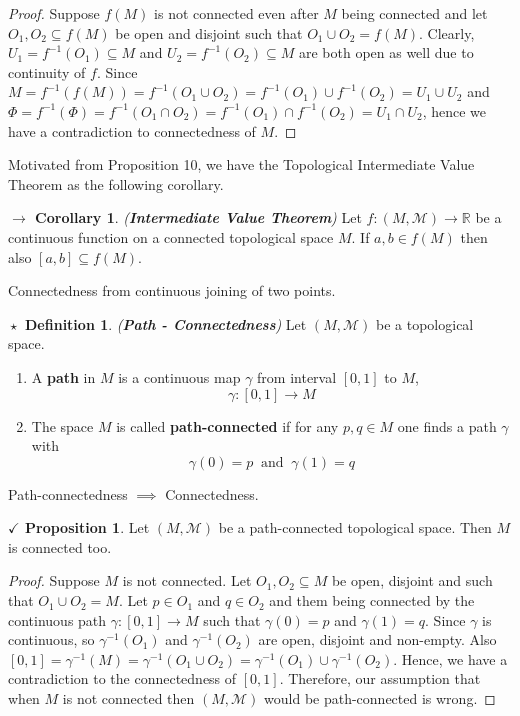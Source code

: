 \documentclass{article}
\theoremstyle{definition}
\newtheorem{definition}{$\boxed{\star}$ Definition}
\newcommand{\tit}[1]{\textit{#1}}
\theoremstyle{remark}
\theoremstyle{definition}
\newtheorem{corollary}{$ \to $ Corollary}
\theoremstyle{definition}
\newtheorem{proposition}{$\checkmark$ Proposition}
\newcommand{\topo}[1]{\mathcal{#1}}
\newcommand{\path}[0]{\gamma}
\begin{document}
\begin{proof}
	Suppose $ f(M) $ is not connected even after $ M $ being connected and let $ O_1 ,O_2 \subseteq f(M) $ be open and disjoint such that $ O_1 \cup O_2 = f(M) $. Clearly, $ U_1 = f^{-1}(O_1) \subseteq M $ and $ U_2 = f^{-1}(O_2) \subseteq M $ are both open as well due to continuity of $ f $. Since $ M = f^{-1}(f(M)) =  f^{-1} \left ( O_1 \cup O_2 \right ) = f^{-1}(O_1) \cup f^{-1}(O_2) = U_1 \cup U_2$ and $\Phi = f^{-1} (\Phi) = f^{-1} (O_1 \cap O_2) = f^{-1} (O_1) \cap f^{-1}(O_2) = U_1 \cap U_2$, hence we have a contradiction to connectedness of $ M $.
\end{proof}
\hrulefill
Motivated from Proposition 10, we have the Topological Intermediate Value Theorem as the following corollary.
\hrulefill
\begin{corollary}
	\tit{(\textbf{Intermediate Value Theorem})} Let $ f : (M,\topo{M}) \longrightarrow \mathbb{R} $ be a continuous function on a connected topological space $ M $. If $ a,b \in f(M) $ then also $ [a,b]  \subseteq f(M)$.
\end{corollary}
\hrulefill
Connectedness from continuous joining of two points.
\hrulefill
\begin{definition}
	\tit{(\textbf{Path - Connectedness})} Let $ (M,\topo{M}) $ be a topological space.
	\begin{enumerate}
		\item{A \textbf{path} in $ M $ is a continuous map $ \path $ from interval $ [0,1] $ to $ M $,
	\[\path : [0,1] \longrightarrow M \]	
	}
\item{The space $ M $ is called \textbf{path-connected} if for any $ p,q \in M $ one finds a path $ \path $ with
\[\path(0) = p\;\;\text{and}\;\;\path(1) = q\]
}
	\end{enumerate}
\end{definition}
\hrulefill
Path-connectedness $ \implies $ Connectedness.
\hrulefill
\begin{proposition}
	Let $ (M,\topo{M}) $ be a path-connected topological space. Then $ M $ is connected too.
\end{proposition}
\begin{proof}
	Suppose $ M $ is not connected. Let $ O_1, O_2 \subseteq M $ be open, disjoint and such that $ O_1 \cup O_2 = M $. Let $ p \in O_1 $ and $ q \in O_2 $ and them being connected by the continuous path $ \path : [0,1] \longrightarrow M$ such that $ \path(0) = p $ and $ \path(1) = q $. Since $ \path $ is continuous, so $ \path^{-1}(O_1) $ and $ \path^{-1}(O_2) $ are open, disjoint and non-empty. Also $ [0,1] = \path^{-1}(M) = \path^{-1}(O_1 \cup O_2 ) = \path^{-1}(O_1) \cup \path^{-1}(O_2) $. Hence, we have a contradiction to the connectedness of $ [0,1] $. Therefore, our assumption that when $ M $ is not connected then $ (M,\topo{M}) $ would be path-connected is wrong.
\end{proof}
\end{document}
